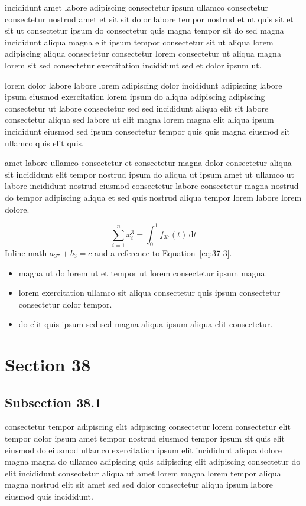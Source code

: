 \documentclass{article}
\begin{document}
incididunt amet labore adipiscing consectetur ipsum ullamco consectetur consectetur nostrud amet et sit sit dolor labore tempor nostrud et ut quis sit et sit ut consectetur ipsum do consectetur quis magna tempor sit do sed magna incididunt aliqua magna elit ipsum tempor consectetur sit ut aliqua lorem adipiscing aliqua consectetur consectetur lorem consectetur ut aliqua magna lorem sit sed consectetur exercitation incididunt sed et dolor ipsum ut.

lorem dolor labore labore lorem adipiscing dolor incididunt adipiscing labore ipsum eiusmod exercitation lorem ipsum do aliqua adipiscing adipiscing consectetur ut labore consectetur sed sed incididunt aliqua elit sit labore consectetur aliqua sed labore ut elit magna lorem magna elit aliqua ipsum incididunt eiusmod sed ipsum consectetur tempor quis quis magna eiusmod sit ullamco quis elit quis.

amet labore ullamco consectetur et consectetur magna dolor consectetur aliqua sit incididunt elit tempor nostrud ipsum do aliqua ut ipsum amet ut ullamco ut labore incididunt nostrud eiusmod consectetur labore consectetur magna nostrud do tempor adipiscing aliqua et sed quis nostrud aliqua tempor lorem labore lorem dolore.

\begin{equation}\label{eq:37-3}
  \sum_{i=1}^{n} x_i^{3} = \int_0^1 f_{37}(t)\,\mathrm{d}t
\end{equation}
Inline math $a_{37} + b_{3} = c$ and a reference to Equation~\eqref{eq:37-3}.

\begin{itemize}
  \item magna ut do lorem ut et tempor ut lorem consectetur ipsum magna.
  \item lorem exercitation ullamco sit aliqua consectetur quis ipsum consectetur consectetur dolor tempor.
  \item do elit quis ipsum sed sed magna aliqua ipsum aliqua elit consectetur.
\end{itemize}

\section{Section 38}\label{sec:38}
\subsection{Subsection 38.1}\label{sec:38-1}
consectetur tempor adipiscing elit adipiscing consectetur lorem consectetur elit tempor dolor ipsum amet tempor nostrud eiusmod tempor ipsum sit quis elit eiusmod do eiusmod ullamco exercitation ipsum elit incididunt aliqua dolore magna magna do ullamco adipiscing quis adipiscing elit adipiscing consectetur do elit incididunt consectetur aliqua ut amet lorem magna lorem tempor aliqua magna nostrud elit sit amet sed sed dolor consectetur aliqua ipsum labore eiusmod quis incididunt.
\end{document}
